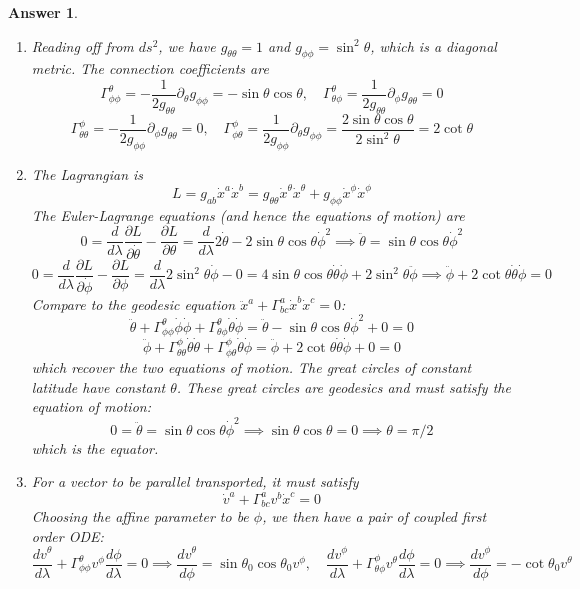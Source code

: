 \documentclass[a4paper]{article}
\theoremstyle{new2}
\newtheorem{ans}{Answer}[section]
\theoremstyle{new}
\begin{document}
\begin{ans}\leavevmode
\begin{enumerate}[label=(\alph*)]
\item Reading off from $ds^2$, we have $g_{\theta\theta}=1$ and $g_{\phi\phi}=\sin^2\theta$, which is a diagonal metric. The connection coefficients are
$$\Gamma_{\phi\phi}^\theta=-\frac{1}{2g_{\theta\theta}}\partial_\theta g_{\phi\phi}=-\sin\theta\cos\theta,\quad\Gamma_{\theta\phi}^\theta=\frac{1}{2g_{\theta\theta}}\partial_\phi g_{\theta\theta}=0$$
$$\Gamma^{\phi}_{\theta\theta}=-\frac{1}{2g_{\phi\phi}}\partial_\phi g_{\theta\theta}=0,\quad\Gamma_{\phi\theta}^\phi=\frac{1}{2g_{\phi\phi}}\partial_\theta g_{\phi\phi}=\frac{2\sin\theta\cos\theta}{2\sin^2\theta}=2\cot\theta$$
\item The Lagrangian is
$$L=g_{ab}\dot{x}^a\dot{x}^b=g_{\theta\theta}\dot{x}^\theta\dot{x}^\theta+g_{\phi\phi}\dot{x}^\phi\dot{x}^\phi$$
The Euler-Lagrange equations (and hence the equations of motion) are
$$0=\frac{d}{d\lambda}\frac{\partial L}{\partial\dot{\theta}}-\frac{\partial L}{\partial\theta}=\frac{d}{d\lambda}2\dot{\theta}-2\sin\theta\cos\theta\dot{\phi}^2\implies\ddot{\theta}=\sin\theta\cos\theta\dot{\phi}^2$$
$$0=\frac{d}{d\lambda}\frac{\partial L}{\partial\dot{\phi}}-\frac{\partial L}{\partial\phi}=\frac{d}{d\lambda}2\sin^2\theta\dot{\phi}-0=4\sin\theta\cos\theta\dot{\theta}\dot{\phi}+2\sin^2\theta\ddot{\phi}\implies\ddot{\phi}+2\cot\theta\dot{\theta}\dot{\phi}=0$$
Compare to the geodesic equation $\ddot{x}^a+\Gamma^a_{bc}\dot{x}^b\dot{x}^c=0$:
$$\ddot{\theta}+\Gamma_{\phi\phi}^\theta\dot{\phi}\dot{\phi}+\Gamma_{\theta\phi}^\theta\dot{\theta}\dot{\phi}=\ddot{\theta}-\sin\theta\cos\theta\dot{\phi}^2+0=0$$
$$\ddot{\phi}+\Gamma_{\theta\theta}^\phi\dot{\theta}\dot{\theta}+\Gamma_{\phi\theta}^\phi\dot{\theta}\dot{\phi}=\ddot{\phi}+2\cot\theta\dot{\theta}\dot{\phi}+0=0$$
which recover the two equations of motion. The great circles of constant latitude have constant $\theta$. These great circles are geodesics and must satisfy the equation of motion:
$$0=\ddot{\theta}=\sin\theta\cos\theta\dot{\phi}^2\implies\sin\theta\cos\theta=0\implies\theta=\pi/2$$
which is the equator.
\item For a vector to be parallel transported, it must satisfy
$$\dot{v}^a+\Gamma_{bc}^av^b\dot{x}^c=0$$
Choosing the affine parameter to be $\phi$, we then have a pair of coupled first order ODE:
$$\frac{dv^\theta}{d\lambda}+\Gamma_{\phi\phi}^\theta v^\phi\frac{d\phi}{d\lambda}=0\implies\frac{dv^\theta}{d\phi}=\sin\theta_0\cos\theta_0 v^\phi,\quad \frac{dv^\phi}{d\lambda}+\Gamma_{\theta\phi}^\phi v^\theta\frac{d\phi}{d\lambda}=0\implies\frac{dv^\phi}{d\phi}=-\cot\theta_0 v^\theta$$

\end{enumerate}
\end{ans}
\end{document}
